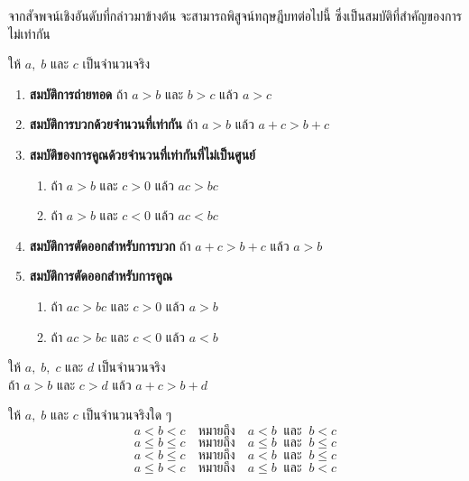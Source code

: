 \vspace{0.5em}
จากสัจพจน์เชิงอันดับที่กล่าวมาข้างต้น จะสามารถพิสูจน์ทฤษฎีบทต่อไปนี้ ซึ่งเป็นสมบัติที่สำคัญของการไม่เท่ากัน
\newpage
\begin{theorembox}
	ให้ $a, \; b$ และ $c$ เป็นจำนวนจริง
\begin{enumerate}[label=\arabic*., leftmargin=*, itemsep=0.6em]
		\item \textbf{สมบัติการถ่ายทอด} 
		ถ้า $a > b$ และ $b > c$ แล้ว $a > c$
		
		\item \textbf{สมบัติการบวกด้วยจำนวนที่เท่ากัน} 
		ถ้า $a > b$ แล้ว $a + c > b + c$
		\item \textbf{สมบัติของการคูณด้วยจำนวนที่เท่ากันที่ไม่เป็นศูนย์}
	\begin{enumerate}[label=\theenumi\arabic*), leftmargin=*, itemsep=0.6em]
		\item ถ้า $a > b$ และ $c > 0$ แล้ว $ac > bc$ 
		\item ถ้า $a > b$ และ $c < 0$ แล้ว $ac < bc$
	\end{enumerate}
		\item \textbf{สมบัติการตัดออกสำหรับการบวก} 
		ถ้า $a + c > b + c$ แล้ว $a > b$
		\item \textbf{สมบัติการตัดออกสำหรับการคูณ}
	\begin{enumerate}[label=\theenumi\arabic*), leftmargin=*, itemsep=0.6em]
		\item ถ้า $ac > bc$ และ $c > 0$ แล้ว $a > b$ 
		\item ถ้า $ac > bc$ และ $c < 0$ แล้ว $a < b$
	\end{enumerate}
\end{enumerate}
\end{theorembox}

\vspace{1em}

\begin{theorembox}
	ให้ $a, \; b, \; c$ และ $d$ เป็นจำนวนจริง
	\\[0.5em]
	ถ้า $a > b$ และ $c > d$ แล้ว $a + c > b + d$
\end{theorembox}

\vspace{1.5em}

\begin{definitionbox}
	ให้ $a, \; b$ และ $c$ เป็นจำนวนจริงใด ๆ
	$$a < b < c \quad \text{หมายถึง} \quad a < b \;\; \text{และ} \;\; b < c$$
	$$a \leq b \leq c \quad \text{หมายถึง} \quad a \leq b \;\; \text{และ} \;\; b \leq c$$
	$$a < b \leq c \quad \text{หมายถึง} \quad a < b \;\; \text{และ} \;\; b \leq c$$
	$$a \leq b < c \quad \text{หมายถึง} \quad a \leq b \;\; \text{และ} \;\; b < c$$
\end{definitionbox}

